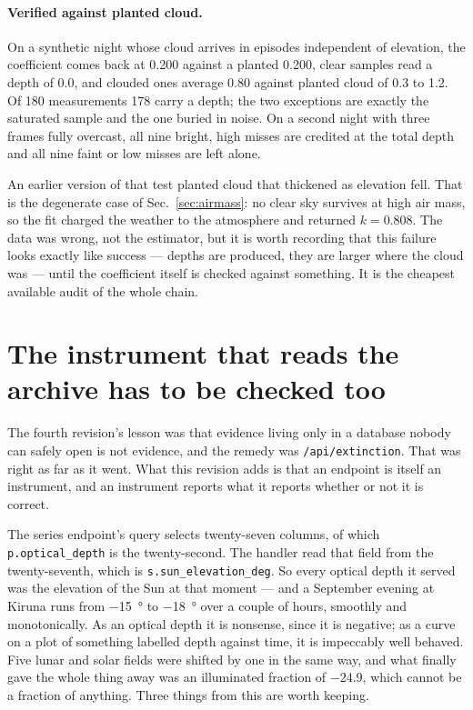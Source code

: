 \documentclass[11pt,a4paper]{article}
\begin{document}
\paragraph{Verified against planted cloud.} On a synthetic night whose cloud
arrives in episodes independent of elevation, the coefficient comes back at
\num{0.200} against a planted \num{0.200}, clear samples read a depth of
\num{0.0}, and clouded ones average \num{0.80} against planted cloud of
\num{0.3} to \num{1.2}. Of 180 measurements 178 carry a depth; the two
exceptions are exactly the saturated sample and the one buried in noise. On a
second night with three frames fully overcast, all nine bright, high misses are
credited at the total depth and all nine faint or low misses are left alone.

An earlier version of that test planted cloud that thickened as elevation fell.
That is the degenerate case of Sec.~\ref{sec:airmass}: no clear sky survives at
high air mass, so the fit charged the weather to the atmosphere and returned
$k=\num{0.808}$. The data was wrong, not the estimator, but it is worth
recording that this failure looks exactly like success --- depths are produced,
they are larger where the cloud was --- until the coefficient itself is checked
against something. It is the cheapest available audit of the whole chain.

\section{The instrument that reads the archive has to be checked too}
\label{sec:audit}

The fourth revision's lesson was that evidence living only in a database nobody
can safely open is not evidence, and the remedy was \texttt{/api/extinction}.
That was right as far as it went. What this revision adds is that an endpoint is
itself an instrument, and an instrument reports what it reports whether or not
it is correct.

The series endpoint's query selects twenty-seven columns, of which
\texttt{p.optical\_depth} is the twenty-second. The handler read that field
from the twenty-seventh, which is \texttt{s.sun\_elevation\_deg}. So every
optical depth it served was the elevation of the Sun at that moment --- and a
September evening at Kiruna runs from \SI{-15}{\degree} to \SI{-18}{\degree}
over a couple of hours, smoothly and monotonically. As an optical depth it is
nonsense, since it is negative; as a curve on a plot of something labelled
depth against time, it is impeccably well behaved. Five lunar and solar fields
were shifted by one in the same way, and what finally gave the whole thing away
was an illuminated fraction of $\num{-24.9}$, which cannot be a fraction of
anything. Three things from this are worth keeping.
\end{document}
